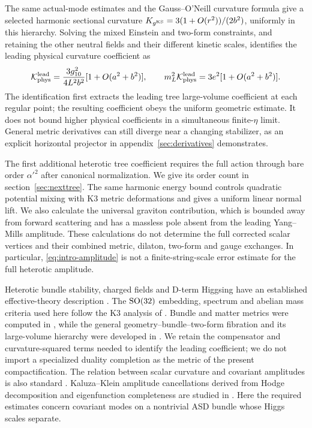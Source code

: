 The same actual-mode estimates and the Gauss--O'Neill curvature formula
give a selected harmonic sectional curvature
$K_{g^{\mathrm{KS}}}=3(1+O(r^2))/(2b^2)$, uniformly in this hierarchy. Solving the
mixed Einstein and two-form constraints, and retaining the other neutral
fields and their different kinetic scales, identifies the leading
physical curvature coefficient as
\begin{equation}\label{eq:intro-curvature}
 \mathcal K_{\rm phys}^{\rm lead}
 =\frac{3g_{10}^2}{4L^2b^2}[1+O(a^2+b^2)],\qquad
 m_L^2\mathcal K_{\rm phys}^{\rm lead}=3e^2[1+O(a^2+b^2)].
\end{equation}
The identification first extracts the leading tree large-volume
coefficient at each regular point; the resulting coefficient obeys the
uniform geometric estimate. It does not bound higher physical
coefficients in a simultaneous finite-$\eta$ limit. General metric
derivatives can still diverge near a changing stabilizer, as an explicit
horizontal projector in appendix~\ref{sec:derivatives} demonstrates.

The first additional heterotic tree coefficient requires the full action
through bare order $\alpha'^2$ after canonical normalization. We give
its order count in section~\ref{sec:nexttree}. The same harmonic energy
bound controls quadratic potential mixing with K3 metric deformations and gives
a uniform linear normal lift. We also calculate the universal graviton
contribution, which is bounded away from forward scattering and has a
massless pole absent from the leading Yang--Mills amplitude. These
calculations do not determine the full corrected scalar vertices and
their combined metric, dilaton, two-form and gauge exchanges. In particular,
\eqref{eq:intro-amplitude} is not a finite-string-scale error estimate
for the full heterotic amplitude.

Heterotic bundle stability, charged fields and D-term Higgsing have an
established effective-theory description \cite{stabilitywalls}.
The $\operatorname{SO}(32)$ embedding, spectrum and abelian mass criteria used here
follow the K3 analysis of \cite{honecker}. Bundle and matter metrics
were computed in \cite{louis}, while the general geometry--bundle--two-form
fibration and its large-volume hierarchy were developed in
\cite{alpv}. We retain the compensator and curvature-squared terms needed
to identify the leading coefficient; we do not import a specialized
duality completion as the metric of the present compactification.
The relation between scalar curvature and covariant amplitudes is also
standard \cite{cheung}.
Kaluza--Klein amplitude cancellations derived from Hodge decomposition
and eigenfunction completeness are studied in
\cite{bonifacio_hinterbichler}. Here the required estimates concern
covariant modes on a nontrivial ASD bundle whose Higgs scales separate.

